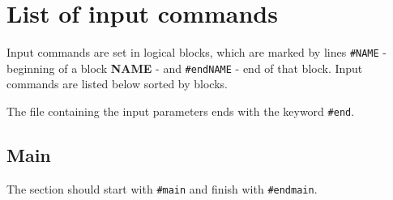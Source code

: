 %

\chapter{List of input commands}

Input commands are set in logical blocks, which are
marked by lines \texttt{\#NAME} - beginning of 
a block {\bf NAME} - and \texttt{\#endNAME} - end
of that block. Input commands are listed below 
sorted by blocks.

The file containing the input parameters ends with the keyword {\tt \#end}.


\section{Main}

The section should start with {\tt \#main} and finish with {\tt \#endmain}. 

